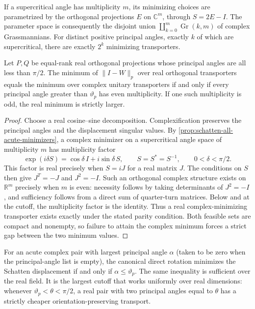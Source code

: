If a supercritical angle has multiplicity $m$, its minimizing choices are
parametrized by the orthogonal projections $E$ on $\mathbb C^m$, through
$S=2E-I$. The parameter space is consequently the disjoint union
$\coprod_{k=0}^{m}\operatorname{Gr}(k,m)$ of complex Grassmannians.
For distinct positive principal angles, exactly $k$ of which are
supercritical, there are exactly $2^k$ minimizing transporters.

\begin{corollary}
\label{cor:schatten-real-parity}
Let $P,Q$ be equal-rank real orthogonal projections whose principal
angles are all less than $\pi/2$. The minimum of $\|I-W\|_p$ over real
orthogonal transporters equals the minimum over complex unitary
transporters if and only if every principal angle greater than
$\vartheta_p$ has even multiplicity. If one such multiplicity is odd,
the real minimum is strictly larger.
\end{corollary}

\begin{proof}
Choose a real cosine--sine decomposition. Complexification preserves the
principal angles and the displacement singular values. By
\cref{prop:schatten-all-acute-minimizers}, a complex minimizer on a
supercritical angle space of multiplicity $m$ has multiplicity factor
\[
 \exp(i\delta S)=\cos\delta\,I+i\sin\delta\,S,
 \qquad S=S^*=S^{-1},\qquad 0<\delta<\pi/2.
\]
This factor is real precisely when $S=iJ$ for a real matrix $J$.
The conditions on $S$ then give $J^T=-J$ and $J^2=-I$.
Such an orthogonal complex structure exists on $\mathbb R^m$ precisely
when $m$ is even: necessity follows by taking determinants of $J^2=-I$,
and sufficiency follows from a direct sum of quarter-turn matrices.
Below and at the cutoff, the multiplicity factor is the identity.
Thus a real complex-minimizing transporter exists exactly under the
stated parity condition. Both feasible sets are compact and nonempty,
so failure to attain the complex minimum forces a strict gap between
the two minimum values.
\end{proof}

\begin{corollary}
\label{cor:schatten-canonical-cutoff}
For an acute complex pair with largest principal angle $\alpha$ (taken
to be zero when the principal-angle list is empty), the
canonical direct rotation minimizes the Schatten displacement if and
only if $\alpha\leq\vartheta_p$. The same inequality is sufficient over
the real field. It is the largest cutoff that works uniformly over
real dimensions: whenever $\vartheta_p<\theta<\pi/2$, a real pair with
two principal angles equal to $\theta$ has a strictly cheaper
orientation-preserving transport.
\end{corollary}


